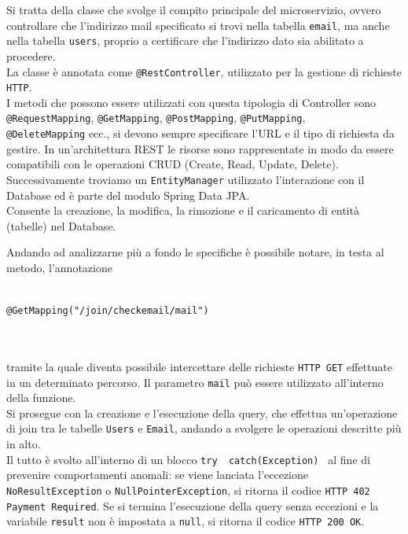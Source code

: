 Si tratta della classe che svolge il compito principale del microservizio, ovvero controllare che l'indirizzo mail specificato si trovi nella 
tabella \texttt{email}, ma anche nella tabella \texttt{users}, proprio a certificare che l'indirizzo dato sia abilitato a procedere.\\
La classe è annotata come \texttt{@RestController}, utilizzato per la gestione di richieste \texttt{HTTP}.\\
I metodi che possono essere utilizzati con questa tipologia di Controller sono \texttt{@RequestMapping}, \texttt{@GetMapping}, 
\texttt{@PostMapping}, \texttt{@PutMapping},\\ \texttt{@DeleteMapping} ecc., si devono sempre specificare l'URL e il tipo di richiesta da gestire.
In un'architettura REST le risorse sono rappresentate in modo da essere compatibili con le operazioni CRUD (Create, Read, Update, Delete).\\
Successivamente troviamo un \texttt{EntityManager} utilizzato l'interazione con il Database ed è parte del modulo Spring Data JPA.\\
Consente la creazione, la modifica, la rimozione e il caricamento di entità (tabelle) nel Database.

Andando ad analizzarne più a fondo le specifiche è possibile notare, in testa al metodo, l'annotazione\\ \\
\centerline{\texttt{@GetMapping("/join/checkemail/{mail}")}} \\ \\
tramite la quale diventa possibile intercettare delle richieste \texttt{HTTP GET} effettuate in un determinato percorso. Il parametro \texttt{{mail}} può essere
utilizzato all'interno della funzione.\\
Si prosegue con la creazione e l'esecuzione della query, che effettua un'operazione di join tra le tabelle \texttt{Users} e \texttt{Email}, andando a 
svolgere le operazioni descritte più in alto.\\
Il tutto è svolto all'interno di un blocco \texttt{try{ } catch(Exception){ }} al fine di prevenire comportamenti anomali: se viene lanciata l'eccezione\\
\texttt{NoResultException} o \texttt{NullPointerException}, si ritorna il codice \texttt{HTTP 402 Payment Required}.
Se si termina l'esecuzione della query senza eccezioni e la variabile \texttt{result} non è impostata a \texttt{null}, si ritorna il codice \texttt{HTTP 200 OK}.

